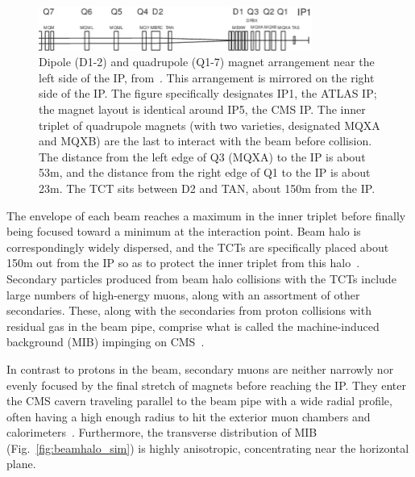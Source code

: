 \documentclass[oneside, letterpaper, 12pt, oldfontcommands]{memoir}
\begin{document}
\begin{figure}[hbtp]
  \begin{center}
    \includegraphics[width=0.80\textwidth]{Figures/magnet_positions.png}
    \caption{
    Dipole (D1-2) and quadrupole (Q1-7) magnet arrangement near the left side of the IP, from~\cite{ref:PAC.2003.1289077}.
    This arrangement is mirrored on the right side of the IP.
    The figure specifically designates IP1, the ATLAS IP; the magnet layout is identical around IP5, the CMS IP.
    The inner triplet of quadrupole magnets (with two varieties, designated MQXA and MQXB)
    are the last to interact with the beam before collision.
    The distance from the left edge of Q3 (MQXA) to the IP is about 53\unit{m},
    and the distance from the right edge of Q1 to the IP is about 23\unit{m}.
    The TCT sits between D2 and TAN, about 150\unit{m} from the IP.
    }
    \label{fig:magnet_positions}
  \end{center}
\end{figure}

The envelope of each beam reaches a maximum in the inner triplet
before finally being focused toward a minimum at the interaction point. Beam halo is correspondingly widely dispersed,
and the TCTs are specifically placed about 150\unit{m} out from the IP so as to protect the inner triplet from this halo~\cite{ref:PhysRevSTAB.18.061001}.
Secondary particles produced from beam
halo collisions with the TCTs include large numbers of high-energy muons, along with an assortment of other secondaries.
These, along with the secondaries from proton collisions with residual gas in the beam pipe, comprise
what is called the machine-induced background (MIB) impinging on CMS~\cite{ref:1748-0221/10/11/P11011}.

In contrast to protons in the beam, secondary muons are neither narrowly nor evenly focused by the final stretch of magnets before reaching the IP.
They enter the CMS cavern traveling parallel to the beam pipe with a wide radial profile, often having a high enough
radius to hit the exterior muon chambers and calorimeters~\cite{ref:1748-0221/10/11/P11011}.
Furthermore, the transverse distribution of MIB (Fig.~\ref{fig:beamhalo_sim}) is highly anisotropic, concentrating near the
horizontal plane.
\end{document}
